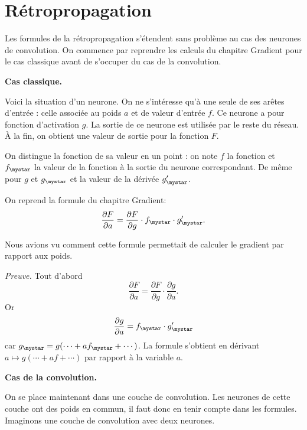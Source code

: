 \documentclass[11pt,class=report,crop=false]{standalone}
\begin{document}
\section{Rétropropagation}


Les formules de la rétropropagation s'étendent sans problème au cas des neurones de convolution.
On commence par reprendre les calculs du chapitre \og{}Gradient\fg{} pour le cas classique avant de s'occuper du cas de la convolution.

\textbf{Cas classique.}

Voici la situation d'un neurone. On ne s'intéresse qu'à une seule de ses arêtes d'entrée : celle associée au poids $a$ et de valeur d'entrée $f$. 
Ce neurone a pour fonction d'activation $g$. La sortie de ce neurone est utilisée par le reste du réseau. À la fin, on obtient une valeur de sortie pour la fonction $F$.



On distingue la fonction de sa valeur en un point : on note $f$ la fonction et $f_\mystar$ la valeur de la fonction à la sortie du neurone correspondant. De même pour $g$ et $g_\mystar$ et la valeur de la dérivée $g'_\mystar$.



On reprend la formule du chapitre \og{}Gradient\fg{}:
$$\frac{\partial F}{\partial a} = \frac{\partial F}{\partial g} \cdot f_\mystar \cdot  g'_\mystar.$$

Nous avions vu comment cette formule permettait de calculer le gradient par rapport aux poids.


\emph{Preuve.}
Tout d'abord $$\frac{\partial F}{\partial a} =  \frac{\partial F}{\partial g} \cdot \frac{\partial g}{\partial a}.$$
Or 
$$\frac{\partial g}{\partial a} = f_\mystar \cdot g'_\mystar$$
car 
$g_\mystar = g(\cdots + a f_\mystar+\cdots)$. La formule s'obtient en dérivant $a \mapsto g(\cdots + a f +\cdots)$ par rapport à la variable $a$.

\textbf{Cas de la convolution.}

On se place maintenant dans une couche de convolution. Les neurones de cette couche ont des poids en commun, il faut donc en tenir compte dans les formules.
Imaginons une couche de convolution avec deux neurones.
\end{document}
